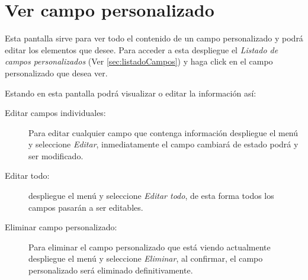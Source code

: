 \section{Ver campo personalizado}
\label{sec:verCampo}
Esta pantalla sirve para ver todo el contenido de un campo personalizado y
podr\'a editar los elementos que desee. Para acceder a esta
despliegue el \emph{Listado de campos personalizados}
(Ver \ref{sec:listadoCampos}) y haga click en el campo personalizado que desea
ver.

Estando en esta pantalla podr\'a visualizar o editar la informaci\'on as\'i:

\begin{description}
\item[Editar campos individuales:]Para editar cualquier campo que contenga
informaci\'on despliegue el men\'u \blackberry y seleccione \emph{Editar},
inmediatamente el campo
cambiar\'a de estado podr\'a y ser modificado.
\item[Editar todo:]despliegue el men\'u \blackberry y seleccione \emph{Editar todo},
de esta forma todos los campos pasar\'an a ser editables.
\item[Eliminar campo personalizado:]Para eliminar el campo personalizado que
est\'a viendo actualmente despliegue el men\'u \blackberry y
seleccione \emph{Eliminar}, al confirmar, el campo personalizado ser\'a
eliminado definitivamente.
\end{description}
\guardarVer